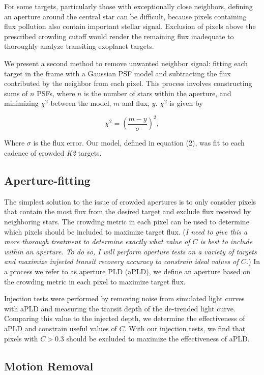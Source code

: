 \documentclass[12pt,preprint]{emulateapj}
\begin{document}
For some targets, particularly those with exceptionally close neighbors, defining an aperture around the central star can be difficult, because pixels containing flux pollution also contain important stellar signal. Exclusion of pixels above the prescribed crowding cutoff would render the remaining flux inadequate to thoroughly analyze transiting exoplanet targets.

We present a second method to remove unwanted neighbor signal: fitting each target in the frame with a Gaussian PSF model and subtracting the flux contributed by the neighbor from each pixel. This process involves constructing sums of $n$ PSFs, where $n$ is the number of stars within the aperture, and minimizing $\chi^2$ between the model, $m$ and flux, $y$. $\chi^2$ is given by

\[
\tag{5}
\chi^2 = \left( \frac{m-y}{\sigma} \right)^2,
\]

Where $\sigma$ is the flux error. Our model, defined in equation (2), was fit to each cadence of crowded \textit{K2} targets.

\subsection{Aperture-fitting}

The simplest solution to the issue of crowded apertures is to only consider pixels that contain the most flux from the desired target and exclude flux received by neighboring stars. The crowding metric in each pixel can be used to determine which pixels should be included to maximize target flux. (\textit{I need to give this a more thorough treatment to determine exactly what value of $C$ is best to include within an aperture. To do so, I will perform aperture tests on a variety of targets and maximize injected transit recovery accuracy to constrain ideal values of $C$.}) In a process we refer to as aperture PLD (aPLD), we define an aperture based on the crowding metric in each pixel to maximize target flux.

Injection tests were performed by removing noise from simulated light curves with aPLD and measuring the transit
depth of the de-trended light curve. Comparing this value to the injected depth, we determine the effectiveness of aPLD and constrain useful values of $C$. With our injection tests, we find that pixels with $C>0.3$ should be excluded to maximize the effectiveness of aPLD.

\subsection{Motion Removal}
\end{document}
